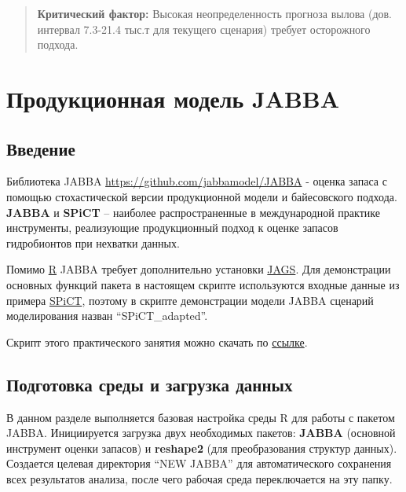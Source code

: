 \documentclass[
  letterpaper,
  DIV=11,
  numbers=noendperiod]{scrreprt}
\begin{document}
\begin{quote}
\textbf{Критический фактор:} Высокая неопределенность прогноза вылова
(дов. интервал 7.3-21.4 тыс.т для текущего сценария) требует осторожного
подхода.
\end{quote}


\chapter{Продукционная модель
JABBA}\label{ux43fux440ux43eux434ux443ux43aux446ux438ux43eux43dux43dux430ux44f-ux43cux43eux434ux435ux43bux44c-jabba}

\section{Введение}\label{ux432ux432ux435ux434ux435ux43dux438ux435-5}

Библиотека JABBA \url{https://github.com/jabbamodel/JABBA} - оценка
запаса с помощью стохастической версии продукционной модели и
байесовского подхода. \textbf{JABBA} и \textbf{SPiCT} -- наиболее
распространенные в международной практике инструменты, реализующие
продукционный подход к оценке запасов гидробионтов при нехватки данных.

Помимо \href{https://cran.r-project.org/}{R} JABBA требует дополнительно
установки \href{https://sourceforge.net/projects/mcmc-jags/}{JAGS}. Для
демонстрации основных функций пакета в настоящем скрипте используются
входные данные из примера
\href{https://mombus.github.io/cRab/chapter\%205.html}{SPiCT}, поэтому в
скрипте демонстрации модели JABBA сценарий моделирования назван
``SPiCT\_adapted''.

Скрипт этого практического занятия можно скачать по
\href{https://mombus.github.io/cRab/data/JABBA.R}{ссылке}.

\section{Подготовка среды и загрузка
данных}\label{ux43fux43eux434ux433ux43eux442ux43eux432ux43aux430-ux441ux440ux435ux434ux44b-ux438-ux437ux430ux433ux440ux443ux437ux43aux430-ux434ux430ux43dux43dux44bux445}

В данном разделе выполняется базовая настройка среды R для работы с
пакетом JABBA. Инициируется загрузка двух необходимых пакетов:
\textbf{JABBA} (основной инструмент оценки запасов) и \textbf{reshape2}
(для преобразования структур данных). Создается целевая директория ``NEW
JABBA'' для автоматического сохранения всех результатов анализа, после
чего рабочая среда переключается на эту папку.
\end{document}
